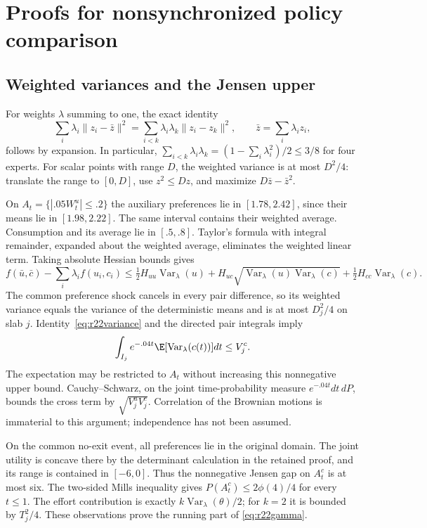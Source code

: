 \section{Proofs for nonsynchronized policy comparison}\label{app:r22proofs}
\subsection{Weighted variances and the Jensen upper}
For weights $\lambda$ summing to one, the exact identity
\begin{equation}
 \sum_i\lambda_i\|z_i-\bar z\|^2
 =\sum_{i<k}\lambda_i\lambda_k\|z_i-z_k\|^2,
 \qquad \bar z=\sum_i\lambda_i z_i,
 \label{eq:r22variance}
\end{equation}
follows by expansion. In particular, $\sum_{i<k}\lambda_i\lambda_k=(1-\sum_i\lambda_i^2)/2\leq3/8$ for four experts. For scalar points with range $D$, the weighted variance is at most $D^2/4$: translate the range to $[0,D]$, use $z^2\leq Dz$, and maximize $D\bar z-\bar z^2$.

On $A_t=\{|.05W_t^u|\leq.2\}$ the auxiliary preferences lie in $[1.78,2.42]$, since their means lie in $[1.98,2.22]$. The same interval contains their weighted average. Consumption and its average lie in $[.5,.8]$. Taylor's formula with integral remainder, expanded about the weighted average, eliminates the weighted linear term. Taking absolute Hessian bounds gives
\[
 f(\bar u,\bar c)-\sum_i\lambda_i f(u_i,c_i)
 \leq\tfrac12H_{uu}\operatorname{Var}_\lambda(u)
 +H_{uc}\sqrt{\operatorname{Var}_\lambda(u)\operatorname{Var}_\lambda(c)}
 +\tfrac12H_{cc}\operatorname{Var}_\lambda(c).
\]
The common preference shock cancels in every pair difference, so its weighted variance equals the variance of the deterministic means and is at most $D_j^2/4$ on slab $j$. Identity~\eqref{eq:r22variance} and the directed pair integrals imply
\[
 \int_{I_j}e^{-.04t}\E[\operatorname{Var}_\lambda(c(t))]dt\leq V_j^c.
\]
The expectation may be restricted to $A_t$ without increasing this nonnegative upper bound. Cauchy--Schwarz, on the joint time-probability measure $e^{-.04t}dt\,dP$, bounds the cross term by $\sqrt{V_j^uV_j^c}$. Correlation of the Brownian motions is immaterial to this argument; independence has not been assumed.

On the common no-exit event, all preferences lie in the original domain. The joint utility is concave there by the determinant calculation in the retained proof, and its range is contained in $[-6,0]$. Thus the nonnegative Jensen gap on $A_t^c$ is at most six. The two-sided Mills inequality gives $P(A_t^c)\leq2\phi(4)/4$ for every $t\leq1$. The effort contribution is exactly $k\operatorname{Var}_\lambda(\theta)/2$; for $k=2$ it is bounded by $T_j^2/4$. These observations prove the running part of \eqref{eq:r22gamma}.

